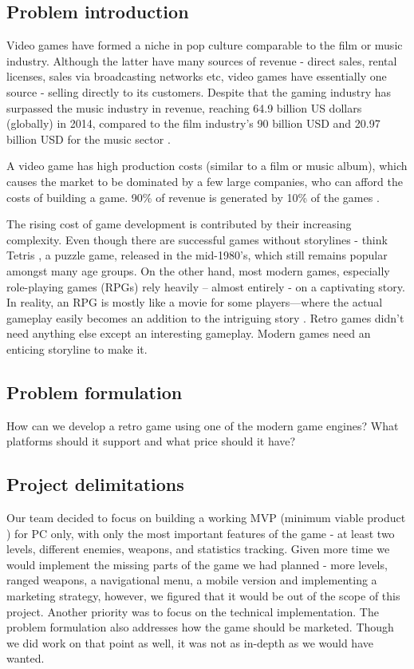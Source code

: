 \documentclass[12p]{article}
\begin{document}
\subsection{Problem introduction} \label{ProblemIntroduction}

Video games have formed a niche in pop culture comparable to the film or music industry. Although the latter have many sources of revenue - direct sales, rental licenses, sales via broadcasting networks etc, video games have essentially one source - selling directly to its customers. Despite that the gaming industry has surpassed the music industry in revenue, reaching 64.9 billion US dollars (globally) in 2014, compared to the film industry’s 90 billion USD and 20.97 billion USD for the music sector \cite{UnderstandingVideoGames}.

A video game has high production costs (similar to a film or music album), which causes the market to be dominated by a few large companies, who can afford the costs of building a game. 90\% of revenue is generated by 10\% of the games \cite{UnderstandingVideoGames}.

The rising cost of game development is contributed by their increasing complexity. Even though there are successful games without storylines - think Tetris \cite{Tetris}, a puzzle game, released in the mid-1980’s, which still remains popular amongst many age groups. On the other hand, most modern games, especially role-playing games (RPGs) rely heavily – almost entirely - on a captivating story. In reality, an RPG is mostly like a movie for some players—where the actual gameplay easily becomes an addition to the intriguing story \cite{GameDevelopmentEssentials}. Retro games didn’t need anything else except an interesting gameplay. Modern games need an enticing storyline to make it.

\subsection{Problem formulation} \label{ProblemFormulation}

How can we develop a retro game using one of the modern game engines? What platforms should it support and what price should it have?

\subsection{Project delimitations} \label{ProjectDelimitations}

Our team decided to focus on building a working MVP (minimum viable product \cite{MVP}) for PC only, with only the most important features of the game - at least two levels, different enemies, weapons, and statistics tracking. Given more time we would implement the missing parts of the game we had planned - more levels, ranged weapons, a navigational menu, a mobile version and implementing a marketing strategy, however, we figured that it would be out of the scope of this project.
Another priority was to focus on the technical implementation. The problem formulation also addresses how the game should be marketed. Though we did work on that point as well, it was not as in-depth as we would have wanted. 
\end{document}

